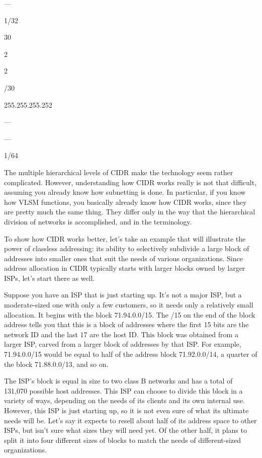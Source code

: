 \documentclass[b5paper,11pt]{memoir}
\begin{document}
---

1/32

30

2

2

/30

255.255.255.252

---

---

1/64

\protect\hypertarget{ch20s04.html}{}{}

The multiple hierarchical levels of CIDR make the technology seem rather
complicated. However, understanding how CIDR works really is not that
difficult, assuming you already know how subnetting is done. In
particular, if you know how VLSM functions, you basically already know
how CIDR works, since they are pretty much the same thing. They differ
only in the way that the hierarchical division of networks is
accomplished, and in the terminology.

To show how CIDR works better, let's take an example that will
illustrate the power of classless
\protect\hypertarget{ch20s04.htmlux5cux23idx-CHP-20-0772}{}{}addressing:
its ability to selectively subdivide a large block of addresses into
smaller ones that suit the needs of various organizations. Since address
allocation in CIDR typically starts with larger blocks owned by larger
ISPs, let's start there as well.

Suppose you have an ISP that is just starting up. It's not a major ISP,
but a moderate-sized one with only a few customers, so it needs only a
relatively small allocation. It begins with the block 71.94.0.0/15. The
/15 on the end of the block address tells you that this is a block of
addresses where the first 15 bits are the network ID and the last 17 are
the host ID. This block was obtained from a larger ISP, carved from a
larger block of addresses by that ISP. For example, 71.94.0.0/15 would
be equal to half of the address block 71.92.0.0/14, a quarter of the
block 71.88.0.0/13, and so on.

The ISP's block is equal in size to two class B networks and has a total
of 131,070 possible host addresses. This ISP can choose to divide this
block in a variety of ways, depending on the needs of its clients and
its own internal use. However, this ISP is just starting up, so it is
not even sure of what its ultimate needs will be. Let's say it expects
to resell about half of its address space to other ISPs, but isn't sure
what sizes they will need yet. Of the other half, it plans to split it
into four different sizes of blocks to match the needs of
different-sized organizations.
\end{document}
